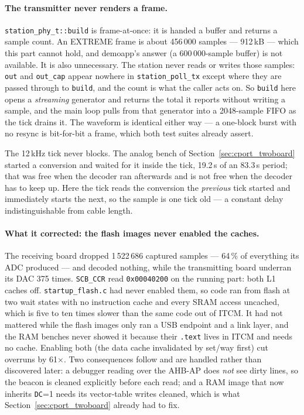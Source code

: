 \paragraph{The transmitter never renders a frame.}
\texttt{station\_phy\_t::build} is frame-at-once: it is handed a buffer
and returns a sample count. An EXTREME frame is about 456\,000 samples
--- 912\,kB --- which this part cannot hold, and demoapp's answer (a
600\,000-sample buffer) is not available. It is also unnecessary. The
station never reads or writes those samples: \texttt{out} and
\texttt{out\_cap} appear nowhere in \texttt{station\_poll\_tx} except
where they are passed through to \texttt{build}, and the count is what
the caller acts on. So \texttt{build} here opens a \emph{streaming}
generator and returns the total it reports without writing a sample,
and the main loop pulls from that generator into a 2048-sample FIFO as
the tick drains it. The waveform is identical either way --- a one-block
burst with no resync is bit-for-bit a frame, which both test suites
already assert.

The 12\,kHz tick never blocks. The analog bench of
Section~\ref{sec:cport_twoboard} started a conversion and waited for it
inside the tick, 19.2\,\textmu s of an 83.3\,\textmu s period; that was
free when the decoder ran afterwards and is not free when the decoder
has to keep up. Here the tick reads the conversion the \emph{previous}
tick started and immediately starts the next, so the sample is one tick
old --- a constant delay indistinguishable from cable length.

\paragraph{What it corrected: the flash images never enabled the
caches.} The receiving board dropped 1\,522\,686 captured samples ---
64\,\% of everything its ADC produced --- and decoded nothing, while the
transmitting board underran its DAC 375 times. \texttt{SCB\_CCR} read
\texttt{0x00040200} on the running part: both L1 caches off.
\texttt{startup\_flash.c} had never enabled them, so code ran from flash
at two wait states with no instruction cache and every SRAM access
uncached, which is five to ten times slower than the same code out of
ITCM. It had not mattered while the flash images only ran a USB endpoint
and a link layer, and the RAM benches never showed it because their
\texttt{.text} lives in ITCM and needs no cache. Enabling both (the data
cache invalidated by set/way first) cut overruns by 61$\times$. Two
consequences follow and are handled rather than discovered later: a
debugger reading over the AHB-AP does \emph{not} see dirty lines, so the
beacon is cleaned explicitly before each read; and a RAM image that now
inherits \texttt{DC}=1 needs its vector-table writes cleaned, which is
what Section~\ref{sec:cport_twoboard} already had to fix.

